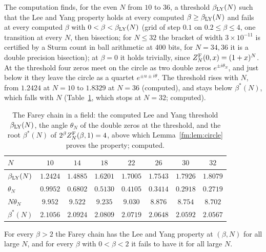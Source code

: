 \begin{resultpar}\label{fm:res:ly}The computation finds, for the even $N$ from $10$ to $36$, a threshold $\beta_{\rm LY}(N)$ such that the Lee and Yang property holds at every computed $\beta\ge\beta_{\rm LY}(N)$ and fails at every computed $\beta$ with $0<\beta<\beta_{\rm LY}(N)$ (grid of step $0.1$ on $0.2\le\beta\le4$, one transition at every $N$, then bisection; for $N\le32$ the bracket of width $3\times10^{-11}$ is certified by a Sturm count in ball arithmetic at 400 bits, for $N=34,36$ it is a double precision bisection); at $\beta=0$ it holds trivially, since $Z^{\rm F}_N(0,x)=(1+x)^N$. At the threshold four zeros meet on the circle as two double zeros $e^{\pm i\theta_N}$, and just below it they leave the circle as a quartet $e^{\pm u\pm i\theta}$. The threshold rises with $N$, from $1.2424$ at $N=10$ to $1.8329$ at $N=36$ (computed), and stays below $\beta^*(N)$, which falls with $N$ (Table~\ref{fm:tab:ly}, which stops at $N=32$; computed).\end{resultpar}

\begin{table}[t]
\centering\small
\begin{tabular}{lccccccc}
\toprule
$N$ & $10$ & $14$ & $18$ & $22$ & $26$ & $30$ & $32$\\
\midrule
$\beta_{\rm LY}(N)$ & $1.2424$ & $1.4885$ & $1.6201$ & $1.7005$ & $1.7543$ & $1.7926$ & $1.8079$\\
$\theta_N$ & $0.9952$ & $0.6802$ & $0.5130$ & $0.4105$ & $0.3414$ & $0.2918$ & $0.2719$\\
$N\theta_N$ & $9.952$ & $9.522$ & $9.235$ & $9.030$ & $8.876$ & $8.754$ & $8.702$\\
$\beta^*(N)$ & $2.1056$ & $2.0924$ & $2.0809$ & $2.0719$ & $2.0648$ & $2.0592$ & $2.0567$\\
\bottomrule
\end{tabular}
\caption{The Farey chain in a field: the computed Lee and Yang threshold $\beta_{\rm LY}(N)$, the angle $\theta_N$ of the double zeros at the threshold, and the root $\beta^*(N)$ of $2^\beta Z^{\rm F}_N(\beta,1)=4$, above which Lemma~\ref{fm:lem:circle} proves the property; computed.}
\label{fm:tab:ly}
\end{table}

\begin{conjecture}\label{fm:conj:ly}
For every $\beta>2$ the Farey chain has the Lee and Yang property at $(\beta,N)$ for all large $N$, and for every $\beta$ with $0<\beta<2$ it fails to have it for all large $N$.
\end{conjecture}

